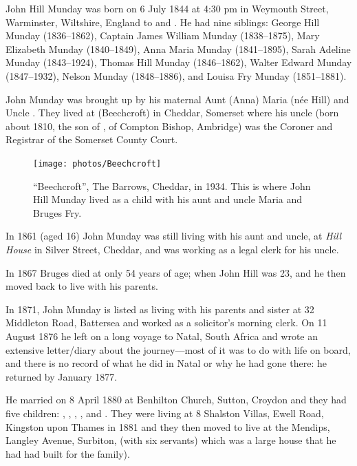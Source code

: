 
John Hill Munday was born on 6 July 1844 at 4:30 pm\cite{GeorgeHillMundayNotes} in Weymouth Street, Warminster, Wiltshire, England\cite{JHMtree, Census1861, JMHbirth} to  and . He had nine siblings: George Hill Munday (1836--1862), Captain James William Munday (1838--1875), Mary Elizabeth Munday (1840--1849), Anna Maria Munday (1841--1895), Sarah Adeline Munday (1843--1924), Thomas Hill Munday (1846--1862), Walter Edward Munday (1847--1932), Nelson Munday (1848--1886), and Louisa Fry Munday (1851--1881).

John Munday was brought up by his maternal Aunt (Anna) Maria (n\'{e}e Hill) and Uncle . They lived at  (\f{Beechcroft}) in Cheddar, Somerset where his uncle (born about 1810, the son of , of Compton Bishop, Ambridge) was the Coroner and Registrar of the Somerset County Court.

\begin{figure}
	\centering
	\texttt{[image: photos/Beechcroft]}
	\caption{``Beechcroft'', The Barrows, Cheddar, in 1934. This is where John Hill Munday lived as a child with his aunt and uncle Maria and Bruges Fry.\cite{BeechcroftPostcard}}
	\label{Beechcroft}
\end{figure}

In 1861 (aged 16) John Munday was still living with his aunt and uncle, at \emph{Hill House} in Silver Street, Cheddar,\cite{Census1861} 
and was working as a legal clerk for his uncle.\cite{Census1861}

In 1867 Bruges died at only 54 years of age;\cite{BrugesDeath} when John Hill was 23, and he then moved back to live with his parents.

In 1871, John Munday is listed as living with his parents and sister at 32 Middleton Road, Battersea and worked as a solicitor's morning clerk.\cite{JohnHillMunday1871} On 11 August 1876 he left on a long voyage to Natal, South Africa and wrote an extensive letter/diary about the journey---most of it was to do with life on board, and there is no record of what he did in Natal or why he had gone there: he returned by January 1877.

He married  on 8 April 1880 at Benhilton Church, Sutton, Croydon\cite{JHM-CA-marriage-announcement, JHMtree} and they had five children: , , , , and .  They were living at 8 Shalston Villas, Ewell Road, Kingston upon Thames in 1881\cite{JohnHillMunday1881} and they then moved to live at the Mendips, Langley Avenue, Surbiton, (with six servants) which was  a large house that he had had  built for the family).


